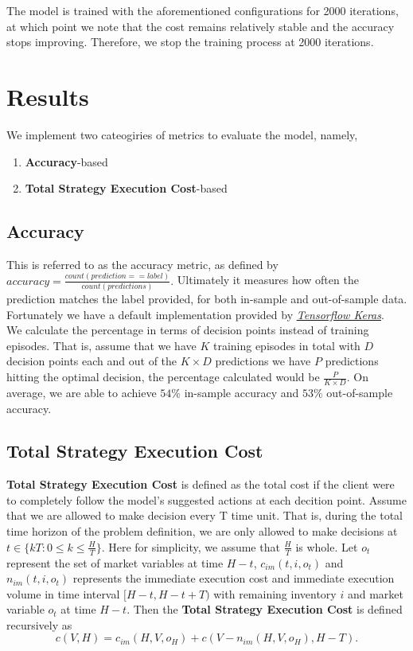 \documentclass[12pt]{extarticle}
\begin{document}
\noindent The model is trained with the aforementioned configurations for 2000 iterations,
at which point we note that the cost remains relatively stable and the accuracy stops
improving. Therefore, we stop the training process at 2000 iterations.

\section{Results} \label{results}

We implement two cateogiries of metrics to evaluate the model, namely,
\begin{enumerate}
  \item \textbf{Accuracy}-based
  \item \textbf{Total Strategy Execution Cost}-based
\end{enumerate}

\subsection{Accuracy}
This is referred to as the accuracy metric, as defined by
$\textit{accuracy} = \frac{\textit{count}(\textit{prediction} == \textit{label})}{\textit{count}(\textit{predictions})}.$
Ultimately it measures how often the prediction matches the label provided, for both in-sample and out-of-sample data.
Fortunately we have a default implementation provided by
\href{https://github.com/tensorflow/tensorflow/blob/r1.13/tensorflow/python/ops/metrics_impl.py}{\textit{Tensorflow Keras}}. \\


\noindent We calculate the percentage in terms of decision points instead of training episodes. That is,
assume that we have $K$ training episodes in total with $D$ decision points each and
out of the $K \times D$ predictions we have $P$ predictions hitting the optimal decision,
the percentage calculated would be $\frac{P}{K \times D}$. On average, we are able to achieve
$54\%$ in-sample accuracy and $53\%$ out-of-sample accuracy.


\subsection{Total Strategy Execution Cost} \label{tsec}
\textbf{Total Strategy Execution Cost} is defined as the total cost if the client were to
completely follow the model's suggested actions at each decition point. Assume that
we are allowed to make decision every T time unit. That is, during the total time horizon
of the problem definition, we are only allowed to make decisions at $t \in \{ kT: 0 \le k \le \frac{H}{T} \}$.
Here for simplicity, we assume that $\frac{H}{T}$ is whole. Let $o_t$ represent the set
of market variables at time $H - t$, $c_{im}(t, i, o_t)$ and $n_{im}(t, i, o_t)$ represents the immediate execution cost and
immediate execution volume in time interval $[H-t, H-t+T)$ with remaining inventory $i$ and market variable $o_t$ at time $H - t$.
Then the \textbf{Total Strategy Execution Cost} is defined recursively as
$$c(V, H) = c_{im}(H, V, o_H) + c(V - n_{im}(H, V, o_H), H - T).$$
\end{document}
